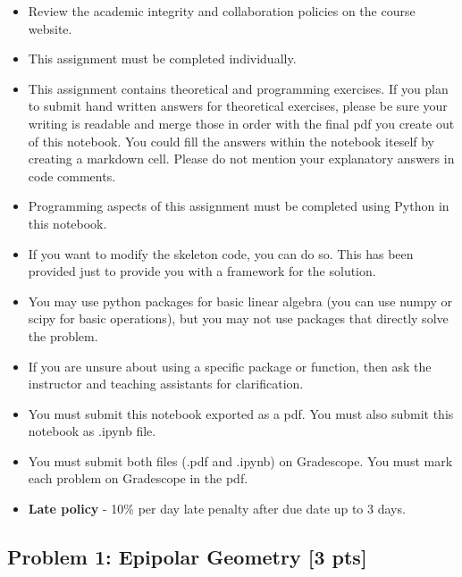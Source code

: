 \documentclass[11pt]{article}
\providecommand{\tightlist}{%
      \setlength{\itemsep}{0pt}\setlength{\parskip}{0pt}}
\begin{document}
\begin{itemize}
\tightlist
\item
  Review the academic integrity and collaboration policies on the course
  website.
\item
  This assignment must be completed individually.
\item
  This assignment contains theoretical and programming exercises. If you
  plan to submit hand written answers for theoretical exercises, please
  be sure your writing is readable and merge those in order with the
  final pdf you create out of this notebook. You could fill the answers
  within the notebook iteself by creating a markdown cell. Please do not
  mention your explanatory answers in code comments.
\item
  Programming aspects of this assignment must be completed using Python
  in this notebook.
\item
  If you want to modify the skeleton code, you can do so. This has been
  provided just to provide you with a framework for the solution.
\item
  You may use python packages for basic linear algebra (you can use
  numpy or scipy for basic operations), but you may not use packages
  that directly solve the problem.
\item
  If you are unsure about using a specific package or function, then ask
  the instructor and teaching assistants for clarification.
\item
  You must submit this notebook exported as a pdf. You must also submit
  this notebook as .ipynb file.
\item
  You must submit both files (.pdf and .ipynb) on Gradescope. You must
  mark each problem on Gradescope in the pdf.
\item
  \textbf{Late policy} - 10\% per day late penalty after due date up to
  3 days.
\end{itemize}

    \hypertarget{problem-1-epipolar-geometry-3-pts}{%
\subsection{Problem 1: Epipolar Geometry {[}3
pts{]}}\label{problem-1-epipolar-geometry-3-pts}}
\end{document}
